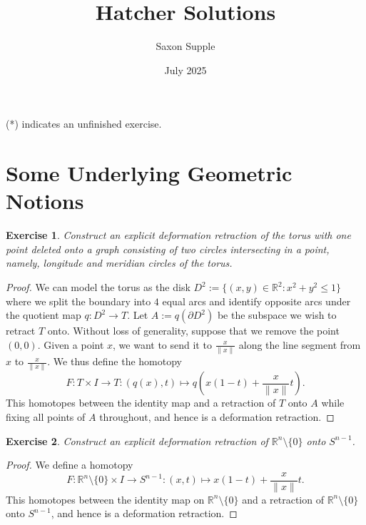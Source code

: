 \documentclass{article}
\title{Hatcher Solutions}
\author{Saxon Supple}
\date{July 2025}
\newtheorem{exercise}{Exercise}[subsection]
\begin{document}
\maketitle
(*) indicates an unfinished exercise.
\section{Some Underlying Geometric Notions}
\begin{exercise}
Construct an explicit deformation retraction of the torus with one point deleted onto a graph consisting of two circles intersecting in a point, namely, longitude and meridian circles of the torus.
\end{exercise}
\begin{proof}
We can model the torus as the disk $D^2:=\{(x,y)\in\mathbb{R}^2:x^2+y^2\leq 1\}$ where we split the boundary into $4$ equal arcs and identify opposite arcs under the quotient map $q:D^2\to T$. Let $A:=q(\partial D^2)$ be the subspace we wish to retract $T$ onto. Without loss of generality, suppose that we remove the point $(0,0)$. Given a point $x$, we want to send it to $\frac{x}{\|x\|}$ along the line segment from $x$ to $\frac{x}{\|x\|}$. We thus define the homotopy \[F:T\times I\to T:(q(x),t)\mapsto q\left(x(1-t)+\frac{x}{\|x\|}t\right).\] This homotopes between the identity map and a retraction of $T$ onto $A$ while fixing all points of $A$ throughout, and hence is a deformation retraction.
\end{proof}

\begin{exercise}
Construct an explicit deformation retraction of $\mathbb{R}^n\setminus\{0\}$ onto $S^{n-1}$.
\end{exercise}
\begin{proof}
We define a homotopy \[F:\mathbb{R}^n\setminus\{0\}\times I\to S^{n-1}:(x,t)\mapsto x(1-t)+\frac{x}{\|x\|}t.\] This homotopes between the identity map on $\mathbb{R}^n\setminus\{0\}$ and a retraction of $\mathbb{R}^n\setminus\{0\}$ onto $S^{n-1}$, and hence is a deformation retraction.
\end{proof}
\end{document}
